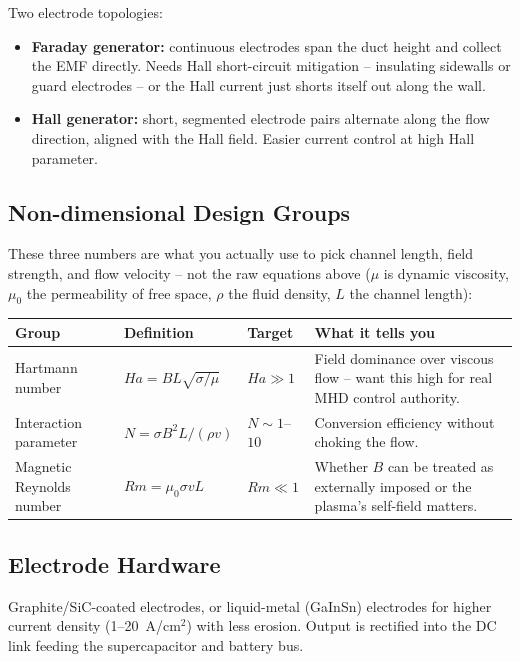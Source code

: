 \documentclass[12pt]{article}
\begin{document}
Two electrode topologies:
\begin{itemize}
    \item \textbf{Faraday generator:} continuous electrodes span the duct height and collect the EMF directly. Needs Hall short-circuit mitigation -- insulating sidewalls or guard electrodes -- or the Hall current just shorts itself out along the wall.
    \item \textbf{Hall generator:} short, segmented electrode pairs alternate along the flow direction, aligned with the Hall field. Easier current control at high Hall parameter.
\end{itemize}

\subsection{Non-dimensional Design Groups}
These three numbers are what you actually use to pick channel length, field strength, and flow velocity -- not the raw equations above ($\mu$ is dynamic viscosity, $\mu_0$ the permeability of free space, $\rho$ the fluid density, $L$ the channel length):

\begin{longtable}{p{3.4cm} p{4.2cm} p{2cm} p{4.4cm}}
\textbf{Group} & \textbf{Definition} & \textbf{Target} & \textbf{What it tells you} \\
\hline
\endhead
Hartmann number & $Ha = BL\sqrt{\sigma/\mu}$ & $Ha \gg 1$ & Field dominance over viscous flow -- want this high for real MHD control authority. \\
Interaction parameter & $N = \sigma B^2 L / (\rho v)$ & $N \sim 1$--$10$ & Conversion efficiency without choking the flow. \\
Magnetic Reynolds number & $Rm = \mu_0 \sigma v L$ & $Rm \ll 1$ & Whether $B$ can be treated as externally imposed or the plasma's self-field matters. \\
\end{longtable}

\subsection{Electrode Hardware}
Graphite/SiC-coated electrodes, or liquid-metal (GaInSn) electrodes for higher current density (1--20~A/cm$^2$) with less erosion. Output is rectified into the DC link feeding the supercapacitor and battery bus.
\end{document}
